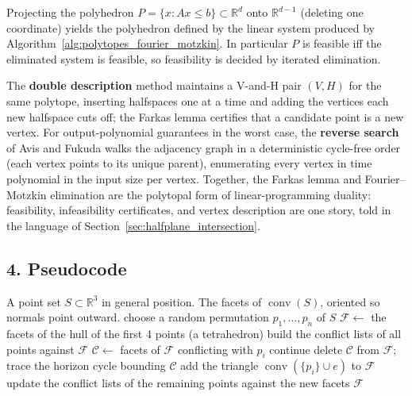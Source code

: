 \begin{theorem}\label{thm:polytopes_fourier_motzkin}
  Projecting the polyhedron $P = \{ x : Ax \le b \} \subset \mathbb{R}^d$
  onto $\mathbb{R}^{d-1}$ (deleting one coordinate) yields the polyhedron
  defined by the linear system produced by
  Algorithm~\ref{alg:polytopes_fourier_motzkin}. In particular $P$ is
  feasible iff the eliminated system is feasible, so feasibility is decided
  by iterated elimination.
\end{theorem}

The \textbf{double description} method \cite{motzkin1953} maintains a
V-and-H pair $(V, H)$ for the same polytope, inserting halfspaces one at a
time and adding the vertices each new halfspace cuts off; the Farkas lemma
certifies that a candidate point is a new vertex. For output-polynomial
guarantees in the worst case, the \textbf{reverse search} of Avis and
Fukuda \cite{avis1992} walks the adjacency graph in a deterministic
cycle-free order (each vertex points to its unique parent), enumerating
every vertex in time polynomial in the input size per vertex. Together, the
Farkas lemma and Fourier--Motzkin elimination are the polytopal form of
linear-programming duality: feasibility, infeasibility certificates, and
vertex description are one story, told in the language of
Section~\ref{sec:halfplane_intersection}.

\subsection{4. Pseudocode}

\begin{algorithm}[htbp]
\caption{Randomized Incremental 3D Convex Hull}
\label{alg:polytopes_incremental_hull}
\begin{algorithmic}[1]
\Require A point set $S \subset \mathbb{R}^3$ in general position.
\Ensure The facets of $\operatorname{conv}(S)$, oriented so normals point outward.
  \State choose a random permutation $p_1, \dots, p_n$ of $S$
  \State $\mathcal{F} \gets$ the facets of the hull of the first 4 points (a tetrahedron)
  \State build the conflict lists of all points against $\mathcal{F}$
    \State $\mathcal{C} \gets$ facets of $\mathcal{F}$ conflicting with $p_i$
      \State continue  
    \EndIf
    \State delete $\mathcal{C}$ from $\mathcal{F}$; trace the horizon cycle bounding $\mathcal{C}$
      \State add the triangle $\operatorname{conv}(\{p_i\} \cup e)$ to $\mathcal{F}$
    \EndFor
    \State update the conflict lists of the remaining points against the new facets
  \EndFor
  \State \Return $\mathcal{F}$
\EndFunction
\end{algorithmic}
\end{algorithm}

